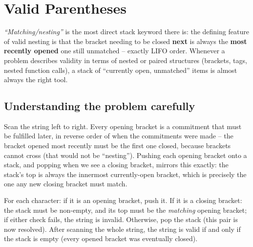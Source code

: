 \section{Valid Parentheses}
\label{sec:sq-valid-parentheses}


\begin{patternbox}
\emph{``Matching/nesting''} is the most direct stack keyword there is: the
defining feature of valid nesting is that the bracket needing to be closed
\textbf{next} is always the \textbf{most recently opened} one still
unmatched -- exactly LIFO order. Whenever a problem describes validity in
terms of nested or paired structures (brackets, tags, nested function
calls), a stack of ``currently open, unmatched'' items is almost always
the right tool.
\end{patternbox}

\subsection*{Understanding the problem carefully}

Scan the string left to right. Every opening bracket is a commitment that
must be fulfilled later, in reverse order of when the commitments were
made -- the bracket opened most recently must be the first one closed,
because brackets cannot cross (that would not be ``nesting''). Pushing
each opening bracket onto a stack, and popping when we see a closing
bracket, mirrors this exactly: the stack's top is always the innermost
currently-open bracket, which is precisely the one any new closing
bracket must match.

\begin{ideabox}
For each character: if it is an opening bracket, push it. If it is a
closing bracket: the stack must be non-empty, and its top must be the
\emph{matching} opening bracket; if either check fails, the string is
invalid. Otherwise, pop the stack (this pair is now resolved). After
scanning the whole string, the string is valid if and only if the stack
is empty (every opened bracket was eventually closed).
\end{ideabox}

